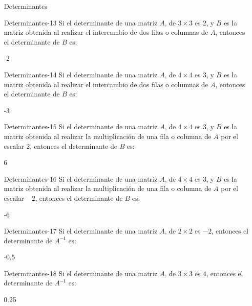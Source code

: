 \documentclass[a4,11pt]{aleph-notas}
\begin{document}
\begin{quiz}{Determinantes}
\begin{numerical}[tolerance=0.01]%
    {Determinantes-13}
    Si el determinante de una matriz $A$, de $3\times 3$ es $2$, y $B$ es la matriz obtenida al realizar el intercambio de dos filas o columnas de $A$, entonces el determinante de $B$ es:
    \item -2
\end{numerical}

\begin{numerical}[tolerance=0.01]%
    {Determinantes-14}
    Si el determinante de una matriz $A$, de $4\times 4$ es $3$, y $B$ es la matriz obtenida al realizar el intercambio de dos filas o columnas de $A$, entonces el determinante de $B$ es:
    \item -3
\end{numerical}

\begin{numerical}[tolerance=0.01]%
    {Determinantes-15}
    Si el determinante de una matriz $A$, de $4\times 4$ es $3$, y $B$ es la matriz obtenida al realizar la multiplicación de una fila o columna de $A$ por el escalar $2$, entonces el determinante de $B$ es:
    \item 6
\end{numerical}

\begin{numerical}[tolerance=0.01]%
    {Determinantes-16}
    Si el determinante de una matriz $A$, de $4\times 4$ es $3$, y $B$ es la matriz obtenida al realizar la multiplicación de una fila o columna de $A$ por el escalar $-2$, entonces el determinante de $B$ es:
    \item -6
\end{numerical}

\begin{numerical}[tolerance=0.01]%
    {Determinantes-17}
    Si el determinante de una matriz $A$, de $2\times 2$ es $-2$, entonces el determinante de $A^{-1}$ es:
    \item -0.5
\end{numerical}

\begin{numerical}[tolerance=0.01]%
    {Determinantes-18}
    Si el determinante de una matriz $A$, de $3\times 3$ es $4$, entonces el determinante de $A^{-1}$ es:
    \item 0.25
\end{numerical}


\end{quiz}
\end{document}
